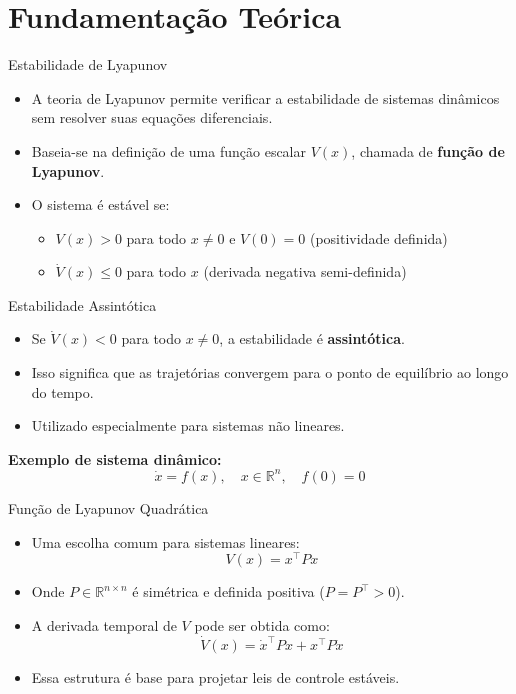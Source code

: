 \documentclass{beamer}
\begin{document}
\section{Fundamentação Teórica}

\begin{frame}{Estabilidade de Lyapunov}
  \begin{itemize}
    \item A teoria de Lyapunov permite verificar a estabilidade de sistemas dinâmicos sem resolver suas equações diferenciais.
    \item Baseia-se na definição de uma função escalar $V(x)$, chamada de \textbf{função de Lyapunov}.
    \item O sistema é estável se:
    \begin{itemize}
      \item $V(x) > 0$ para todo $x \neq 0$ e $V(0) = 0$ (positividade definida)
      \item $\dot{V}(x) \leq 0$ para todo $x$ (derivada negativa semi-definida)
    \end{itemize}
  \end{itemize}
\end{frame}
\begin{frame}{Estabilidade Assintótica}
  \begin{itemize}
    \item Se $\dot{V}(x) < 0$ para todo $x \neq 0$, a estabilidade é \textbf{assintótica}.
    \item Isso significa que as trajetórias convergem para o ponto de equilíbrio ao longo do tempo.
    \item Utilizado especialmente para sistemas não lineares.
  \end{itemize}

  \vspace{0.5cm}
  \textbf{Exemplo de sistema dinâmico:}
  \[
  \dot{x} = f(x), \quad x \in \mathbb{R}^n,\quad f(0) = 0
  \]
\end{frame}
\begin{frame}{Função de Lyapunov Quadrática}
  \begin{itemize}
    \item Uma escolha comum para sistemas lineares:
    \[
    V(x) = x^\top P x
    \]
    \item Onde $P \in \mathbb{R}^{n \times n}$ é simétrica e definida positiva ($P = P^\top > 0$).
    \item A derivada temporal de $V$ pode ser obtida como:
    \[
    \dot{V}(x) = \dot{x}^\top P x + x^\top P \dot{x}
    \]
    \item Essa estrutura é base para projetar leis de controle estáveis.
  \end{itemize}
\end{frame}
\end{document}
